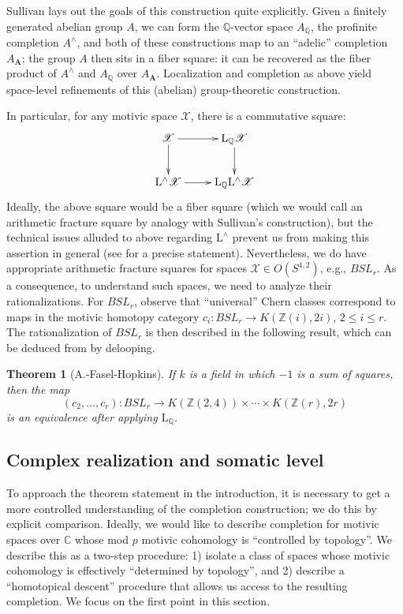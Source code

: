 \documentclass[11pt,leqno]{article}
\newcommand{\cplx}{{\mathbb C}}
\newcommand{\Q}{{\mathbb Q}}
\newcommand{\Z}{{\mathbb Z}}
\renewcommand{\1}{{\rm 1\hspace*{-0.4ex}%
\rule{0.1ex}{1.52ex}\hspace*{0.2ex}}}
\renewcommand{\L}{{\mathrm L}}
\newcommand{\<}[1]{{\langle}#1 {\rangle}}
\newcounter{intro}
\theoremstyle{plain}
\newtheorem{theorem}{Theorem}[subsection]
\theoremstyle{definition}
\theoremstyle{remark}
\numberwithin{equation}{subsection}
\begin{document}
Sullivan \cite[p. 30]{Sullivan2004GeometricTopology} lays out the goals of this construction quite explicitly.  Given a finitely generated abelian group $A$, we can form the $\Q$-vector space $A_{\Q}$, the profinite completion $A^{\wedge}$, and both of these constructions map to an ``adelic'' completion $A_{\mathbf{A}}$; the group $A$ then sits in a fiber square: it can be recovered as the fiber product of $A^{\wedge}$ and $A_{\Q}$ over $A_{\mathbf{A}}$.  Localization and completion as above yield space-level refinements of this (abelian) group-theoretic construction.  

In particular, for any motivic space $\mathscr{X}$, there is a commutative square:
\[
\xymatrix{
\mathscr{X} \ar[r]\ar[d] & \L_{\Q}\mathscr{X} \ar[d] \\
\L^{\wedge} \mathscr{X} \ar[r] & \L_{\Q} \L^{\wedge} \mathscr{X}
}
\]
Ideally, the above square would be a fiber square (which we would call an arithmetic fracture square by analogy with Sullivan's construction), but the technical issues alluded to above regarding $\L^{\wedge}$ prevent us from making this assertion in general (see \cite[Theorem 8.7]{Mattis2024ArithmeticFracture} for a precise statement).  Nevertheless, we do have appropriate arithmetic fracture squares for spaces $\mathscr{X} \in O(S^{4,2})$, e.g., $BSL_r$.  As a consequence, to understand such spaces, we need to analyze their rationalizations.  For $BSL_r$, observe that ``universal'' Chern classes correspond to maps in the motivic homotopy category $c_i: BSL_r \to K(\Z(i),2i)$, $2 \leq i \leq r$.  The rationalization of $BSL_r$ is then described in the following result, which can be deduced from \cite[Theorem 5.2.1]{AFHLocalization} by delooping.

\begin{theorem}[A.-Fasel-Hopkins]
	\label{thm:rationalsplittingBSLr}
	If $k$ is a field in which $-1$ is a sum of squares, then the map
	\[
	(c_2,\ldots,c_r): BSL_r \longrightarrow K(\Z(2,4)) \times \cdots \times K(\Z(r),2r)
	\]
	is an equivalence after applying $\L_{\Q}$.
\end{theorem}




\subsection{Complex realization and somatic level}
\label{ss:somaticlevel}
To approach the theorem statement in the introduction, it is necessary to get a more controlled understanding of the completion construction; we do this by explicit comparison.  Ideally, we would like to describe completion for motivic spaces over $\cplx$ whose mod $p$ motivic cohomology is ``controlled by topology''.  We describe this as a two-step procedure: 1) isolate a class of spaces whose motivic cohomology is effectively ``determined by topology'', and 2) describe a ``homotopical descent'' procedure that allows us access to the resulting completion.  We focus on the first point in this section.
\end{document}

